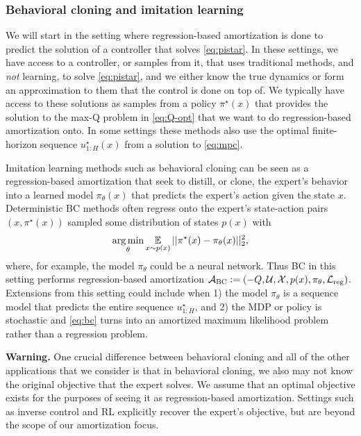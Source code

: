 \documentclass[twoside,11pt]{article}
\begin{document}
\subsubsection{Behavioral cloning and imitation learning}
We will start in the setting where regression-based amortization
is done to predict the solution of a controller that
solves \cref{eq:pistar}.
In these settings, we have access to a controller, or samples from it,
that uses traditional methods, and \emph{not} learning,
to solve \cref{eq:pistar}, and we either know
the true dynamics or form an approximation to them
that the control is done on top of.
We typically have access to these solutions as samples
from a policy $\pi^\star(x)$ that provides the solution
to the max-Q problem in \cref{eq:Q-opt} that we want to
do regression-based amortization onto.
In some settings these methods also use the
optimal finite-horizon sequence $u^\star_{1:H}(x)$
from a solution to \cref{eq:mpc}.

Imitation learning methods such as behavioral cloning can be
seen as a regression-based amortization
that seek to distill, or clone,
the expert's behavior into a learned model $\pi_\theta(x)$
that predicts the expert's action given the state $x$.
Deterministic BC methods often regress onto the expert's
state-action pairs $(x, \pi^\star(x))$
sampled some distribution of states $p(x)$ with
\begin{equation}
  \operatorname*{arg\,min}_\theta \operatorname*{\mathbb{E}}_{x\sim p(x)} ||\pi^\star(x)-\pi_\theta(x)||_2^2,
  \label{eq:bc}
\end{equation}
where, for example, the model $\pi_\theta$ could
be a neural network.
Thus BC in this setting performs regression-based amortization
${\mathcal{A}}_{\rm BC}\vcentcolon= (-Q, {\mathcal{U}}, {\mathcal{X}}, p(x), \pi_\theta, {\mathcal{L}}_{\rm reg})$.
Extensions from this setting could include when
1) the model $\pi_\theta$ is a sequence model that
predicts the entire sequence $u^\star_{1:H}$, and
2) the MDP or policy is stochastic and
\cref{eq:bc} turns into an amortized maximum likelihood
problem rather than a regression problem.

\textbf{Warning.}
One crucial difference between behavioral cloning
and all of the other applications that we consider
is that in behavioral cloning, we also may not know
the original objective that the expert solves.
We assume that an optimal objective
exists for the purposes of seeing it as regression-based
amortization.
Settings such as inverse control and RL
explicitly recover the expert's objective, but are
beyond the scope of our amortization focus.
\end{document}
